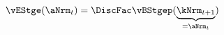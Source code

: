   \begin{equation}\begin{gathered}\begin{aligned}
\vEStge(\aNrm_{t}) & = \DiscFac \vBStgep(\underbrace{\kNrm_{t+1}}_{=\aNrm_{t}}) \label{eq:vEStge}
      \end{aligned}\end{gathered}\end{equation}
